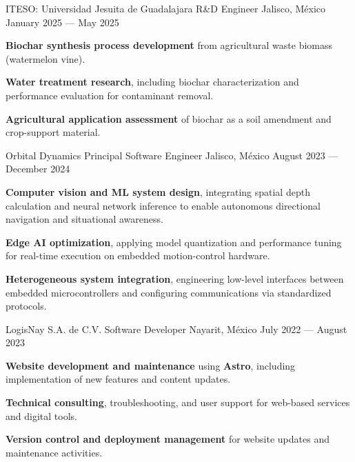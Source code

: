 \begin{cventries}
  \cventry
  {ITESO\@: Universidad Jesuita de Guadalajara}
  {R\&D Engineer}
  {Jalisco, México}
  {January 2025 --- May 2025}
  {
    \begin{cvitems}
      \item {\textbf{Biochar synthesis process development} from agricultural waste biomass (watermelon vine).}
      \item {\textbf{Water treatment research}, including biochar characterization and performance evaluation for contaminant removal.}
      \item {\textbf{Agricultural application assessment} of biochar as a soil amendment and crop-support material.}
    \end{cvitems}
  }

  \cventry
  {Orbital Dynamics}
  {Principal Software Engineer}
  {Jalisco, México}
  {August 2023 --- December 2024}
  {
    \begin{cvitems}
      \item {\textbf{Computer vision and ML system design}, integrating spatial depth calculation and neural network inference to enable autonomous directional navigation and situational awareness.}
      \item {\textbf{Edge AI optimization}, applying model quantization and performance tuning for real-time execution on embedded motion-control hardware.}
      \item {\textbf{Heterogeneous system integration}, engineering low-level interfaces between embedded microcontrollers and configuring communications via standardized protocols.}
    \end{cvitems}
  }

  \cventry
  {LogisNay S.A. de C.V.}
  {Software Developer}
  {Nayarit, México}
  {July 2022 --- August 2023}
  {
    \begin{cvitems}
      \item {\textbf{Website development and maintenance} using \textbf{Astro}, including implementation of new features and content updates.}
      \item {\textbf{Technical consulting}, troubleshooting, and user support for web-based services and digital tools.}
      \item {\textbf{Version control and deployment management} for website updates and maintenance activities.}
    \end{cvitems}
  }

\end{cventries}